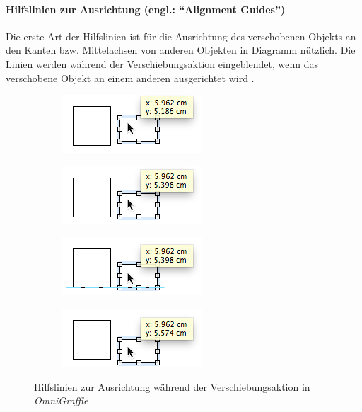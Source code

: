 \paragraph{Hilfslinien zur Ausrichtung (engl.: \enquote{Alignment Guides})}

Die erste Art der Hilfslinien ist für die Ausrichtung des verschobenen Objekts an den Kanten bzw. Mittelachsen von anderen Objekten in Diagramm nützlich. Die Linien werden während der Verschiebungsaktion eingeblendet, wenn das verschobene Objekt an einem anderen ausgerichtet wird \cite{11Keynote}.

\begin{figure}[hbt]
    \newcommand{\subfigurewidth}{0.5\textwidth}
    \begin{subfigure}{\subfigurewidth}
        \centering
        \includegraphics{assets/omnigraffle-smart-guides-a}
        \caption{}
        \label{fig:omnigraffle-smart-guides-a}
    \end{subfigure}
    \begin{subfigure}{\subfigurewidth}
        \centering
        \includegraphics{assets/omnigraffle-smart-guides-b}
        \caption{}
        \label{fig:omnigraffle-smart-guides-b}
    \end{subfigure}
    \begin{subfigure}{\subfigurewidth}
        \centering
        \includegraphics{assets/omnigraffle-smart-guides-c}
        \caption{}
        \label{fig:omnigraffle-smart-guides-c}
    \end{subfigure}
    \begin{subfigure}{\subfigurewidth}
        \centering
        \includegraphics{assets/omnigraffle-smart-guides-d}
        \caption{}
        \label{fig:omnigraffle-smart-guides-d}
    \end{subfigure}
    \caption{Hilfslinien zur Ausrichtung während der Verschiebungsaktion in \textit{OmniGraffle}}
    \label{fig:omnigraffle-smart-guides}
\end{figure}

